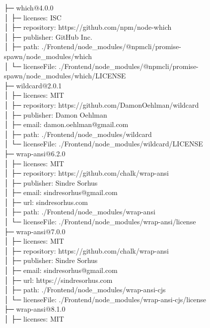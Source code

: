 \documentclass[
    paper=a4,
    twoside=false,
    parskip=half,
    listof=entryprefix,
    listof=totoc,
    index=totoc,
    bibliography=totoc,
    headsepline,
]{scrbook}
\begin{document}
    ├─ which@4.0.0\\
    │  ├─ licenses: ISC\\
    │  ├─ repository: https://github.com/npm/node-which\\
    │  ├─ publisher: GitHub Inc.\\
    │  ├─ path: ./Frontend/node\_modules/@npmcli/promise-spawn/node\_modules/which\\
    │  └─ licenseFile: ./Frontend/node\_modules/@npmcli/promise-spawn/node\_modules/which/LICENSE\\
    ├─ wildcard@2.0.1\\
    │  ├─ licenses: MIT\\
    │  ├─ repository: https://github.com/DamonOehlman/wildcard\\
    │  ├─ publisher: Damon Oehlman\\
    │  ├─ email: damon.oehlman@gmail.com\\
    │  ├─ path: ./Frontend/node\_modules/wildcard\\
    │  └─ licenseFile: ./Frontend/node\_modules/wildcard/LICENSE\\
    ├─ wrap-ansi@6.2.0\\
    │  ├─ licenses: MIT\\
    │  ├─ repository: https://github.com/chalk/wrap-ansi\\
    │  ├─ publisher: Sindre Sorhus\\
    │  ├─ email: sindresorhus@gmail.com\\
    │  ├─ url: sindresorhus.com\\
    │  ├─ path: ./Frontend/node\_modules/wrap-ansi\\
    │  └─ licenseFile: ./Frontend/node\_modules/wrap-ansi/license\\
    ├─ wrap-ansi@7.0.0\\
    │  ├─ licenses: MIT\\
    │  ├─ repository: https://github.com/chalk/wrap-ansi\\
    │  ├─ publisher: Sindre Sorhus\\
    │  ├─ email: sindresorhus@gmail.com\\
    │  ├─ url: https://sindresorhus.com\\
    │  ├─ path: ./Frontend/node\_modules/wrap-ansi-cjs\\
    │  └─ licenseFile: ./Frontend/node\_modules/wrap-ansi-cjs/license\\
    ├─ wrap-ansi@8.1.0\\
    │  ├─ licenses: MIT\\
\end{document}
